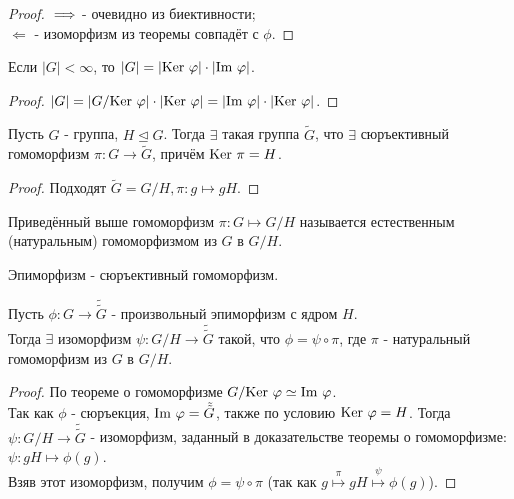 \begin{proof}  
    $ \\ \Longrightarrow$ - очевидно из биективности;\\
    $\Longleftarrow$ - изоморфизм из теоремы совпадёт с $\phi$.  
\end{proof}
\begin{consequensenum}
    Если $|G| < \infty$, то $|G| = |\textup{Ker }\phi|\cdot|\textup{Im }\phi|$.
\end{consequensenum}
\begin{proof}
    $|G| = |G/\textup{Ker }\phi|\cdot|\textup{Ker }\phi| = |\textup{Im }\phi| \cdot |\textup{Ker }\phi|$.
\end{proof}
\begin{subtheorem}
    Пусть $G$ - группа, $H \unlhd G$. Тогда $\exists$ такая группа $\tilde{G}$, что $\exists$ сюръективный гомоморфизм $\pi: G \rightarrow \tilde{G}$, причём $\textup{Ker }\pi = H$.
\end{subtheorem}
\begin{proof}
    Подходят $\tilde{G} = G/H, \pi: g \mapsto gH$.
\end{proof}
\begin{definition}
    Приведённый выше гомоморфизм $\pi: G \mapsto G/H$ называется естественным (натуральным) гомоморфизмом из $G$ в $G/H$.
\end{definition}
\begin{definition}
    Эпиморфизм - сюръективный гомоморфизм.
\end{definition}
\begin{subtheorem}
    Пусть $\phi: G \rightarrow \tilde{\tilde{G}}$ - произвольный эпиморфизм с ядром $H$.\\
    Тогда $\exists$ изоморфизм $\psi: G/H \rightarrow \tilde{\tilde{G}}$ такой, что $\phi = \psi \circ \pi$, где $\pi$ - натуральный гомоморфизм из $G$ в $G/H$.
\end{subtheorem}
\begin{proof}
    По теореме о гомоморфизме $G/ \textup{Ker }\phi \simeq \textup{Im }\phi$.\\
    Так как $\phi$ - сюръекция, $\textup{Im }\phi =  \tilde{\tilde{G}}$, также по условию $\textup{Ker }\phi = H$. Тогда $\psi: G/H \rightarrow \tilde{\tilde{G}}$ - изоморфизм, заданный в доказательстве теоремы о гомоморфизме: $\psi: gH \mapsto \phi(g)$.\\
    Взяв этот изоморфизм, получим $\phi = \psi \circ \pi$ (так как $g \overset{\pi}{\mapsto} gH \overset{\psi}{\mapsto} \phi(g)$).
\end{proof}
\setcounter{thcount}{0}
\setcounter{concount}{0}
\setcounter{subthcount}{0}
\setcounter{lemcount}{0}
\newpage